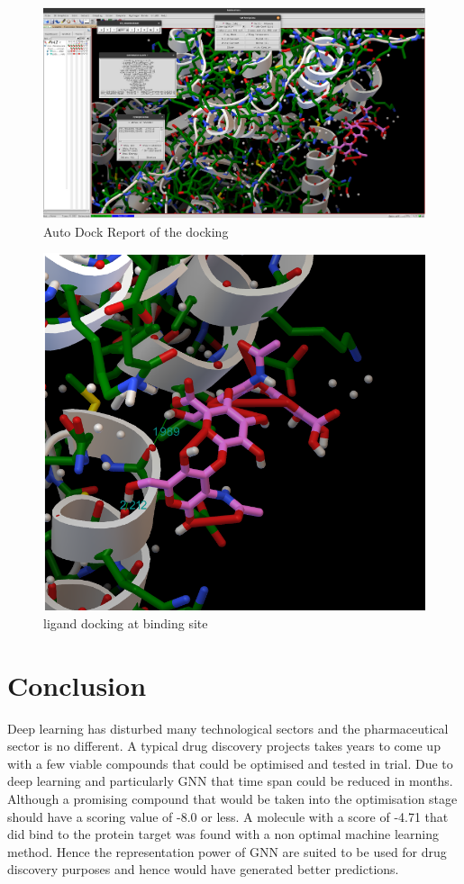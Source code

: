 \documentclass[10pt,twocolumn,letterpaper]{article}
\begin{document}
\begin{figure}[h!]
  \includegraphics[width=\linewidth]{vina1.png}
  \caption{Auto Dock Report of the docking}
  \label{fig:graph}
\end{figure}



\begin{figure}[h!]
  \includegraphics[width=\linewidth]{vina2.png}
  \caption{ligand docking at binding site}
  \label{fig:graph}
\end{figure}

\section{Conclusion}
Deep learning has disturbed many technological sectors and the pharmaceutical sector is no different. A typical drug discovery projects takes years to come up with a few viable compounds that could be optimised and tested in trial. Due to deep learning and particularly GNN that time span could be reduced in months. Although a promising compound that would be taken into the optimisation stage should have a scoring value of -8.0 or less. A molecule with a score of -4.71 that did bind to the protein target was found with a non optimal machine learning method. Hence the representation power of GNN are suited to be used for drug discovery purposes and hence would have generated better predictions. 
\end{document}
